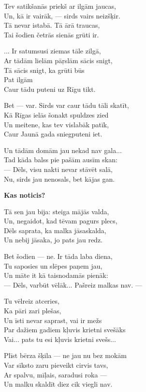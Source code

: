 \documentclass[14pt]{extarticle}
\begin{document}
{{Tev satikšanās priekš ar ilgām jaucas,\\
Un, kā ir vairāk, --- sirds vairs neizšķir.\\
Tā nevar istabā. Tā ārā traucas,\\
Tai šodien četrās sienās grūti ir. 

... Ir satumsusi ziemas tāle zilgā,\\
Ar tādām lielām pāŗslām sācis snigt,\\
Tā sācis snigt, ka grūti būs\\
Pat ilgām\\
Caur tādu puteni uz Rīgu tikt. 

Bet --- var. Sirds var caur tādu tāli skatīt,\\
Kā Rīgas ielās šonakt spuldzes zied\\
Un meitene, kas tev vislabāk patīk,\\
Caur Jaunā gada sniegputeni iet. 

Un tādām domām jau nekad nav gala...\\
Tad kāda balss pie pašām ausīm skan:\\
--- Dēls, visu nakti nevar stāvēt salā,\\
Nu, sirds jau nenosals, bet kājas gan. 


\newpage

{\bf Kas noticis?}

Tā sen jau bija: steiga mājās valda,\\
Un, negaidot, kad tēvam pagurs plecs,\\
Dēls saprata, ka malka jāsaskalda,\\
Un nebij jāsaka, jo pats jau redz. 

Bet šodien --- ne. Ir tāda laba diena,\\
Tu saposies un slēpes paņem jau,\\
Un māte it kā taisnodamās pienāk:\\
--- Dēls, varbūt vēlāk... Pašreiz malkas nav. ---

Tu vēlreiz atceries,\\
Ka pāri zari plešas,\\
Un īsti nevar saprast, vai ir mežs\\
Par dažiem gadiem kļuvis krietni svešāks\\
Vai... pats tu esi kļuvis krietni svešs...

Plīst bērza šķila --- ne jau nu bez mokām\\
Var sīksto zaru pieveikt cirvis tavs,\\
Ar spalvu, mīļais, saradusi roka ---\\
Un malku skaldīt diez cik viegli nav. 

}}
\end{document}
